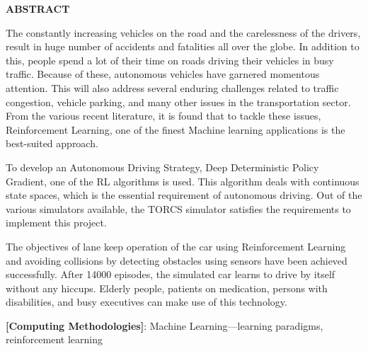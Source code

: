 \begin{center}
\Large{\textbf{ABSTRACT}}\\
\end{center}

The constantly increasing vehicles on the road and the carelessness of the drivers, result in huge number of accidents and fatalities all over the globe. In addition to this, people spend a lot of their time on roads driving their vehicles in busy traffic. Because of these, autonomous vehicles have garnered momentous attention. 
This will also address several enduring challenges related to traffic congestion, vehicle parking, and many other issues in the transportation sector. 
From the various recent literature, it is found that to tackle these issues, Reinforcement Learning, one of the finest Machine learning applications is the best-suited approach. 

To develop an Autonomous Driving Strategy, Deep Deterministic Policy Gradient, one of the RL algorithms is used. This algorithm deals with continuous state spaces, which is the essential requirement of autonomous driving.  Out of the various simulators available, the TORCS simulator satisfies the requirements to implement this project. 

The objectives of lane keep  operation of the car using Reinforcement Learning and avoiding collisions by detecting obstacles using sensors have been achieved successfully. After 14000 episodes, the simulated car learns to drive by itself without any hiccups. Elderly people, patients on medication, persons with disabilities, and busy executives can make use of this technology.



\par 
\textbf{[Computing Methodologies]}: Machine Learning—learning paradigms, reinforcement learning

